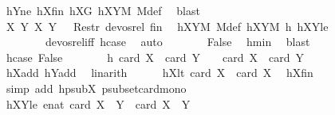 \begin{isabellebody}
\ hY{}ne\ hX{}fin\ hX{}G\ hXYM\ M{\isacharunderscore}{\kern0pt}def\ \isamarkupfalse%
\ blast\isanewline
\ \ \ \ \isamarkupfalse%
\ \isamarkupfalse%
\ {\isachardoublequoteopen}{\isacharparenleft}{\kern0pt}{\isacharparenleft}{\kern0pt}{\isacharquery}{\kern0pt}X{}{\isacharcomma}{\kern0pt}\ {\isacharquery}{\kern0pt}Y{}{\isacharparenright}{\kern0pt}{\isacharcomma}{\kern0pt}\ {\isacharparenleft}{\kern0pt}X{\isacharcomma}{\kern0pt}\ Y{\isacharparenright}{\kern0pt}{\isacharparenright}{\kern0pt}\ {\isasymin}\ \ Restr\ devos{\isacharunderscore}{\kern0pt}rel\ {\isacharquery}{\kern0pt}fin{\isachardoublequoteclose}\ \isamarkupfalse%
\ hXYM\ M{\isacharunderscore}{\kern0pt}def\ hXY{}M\ h\ hXY{}le\ \isanewline
\ \ \ \ \ \ \ \ devos{\isacharunderscore}{\kern0pt}rel{\isacharunderscore}{\kern0pt}iff\ hcase\ \isamarkupfalse%
\ auto\isanewline
\ \ \ \ \isamarkupfalse%
\ \isamarkupfalse%
\ False\ \isamarkupfalse%
\ hmin\ \isamarkupfalse%
\ blast\ \isanewline
\ \ \isamarkupfalse%
\isanewline
\ \ \ \ \isamarkupfalse%
\ hcase{\isacharcolon}{\kern0pt}\ False\isanewline
\ \ \ \ \isamarkupfalse%
\ \isamarkupfalse%
\ h{\isacharcolon}{\kern0pt}\ {\isachardoublequoteopen}card\ {\isacharquery}{\kern0pt}X{}\ {\isacharplus}{\kern0pt}\ card\ {\isacharquery}{\kern0pt}Y{}\ {\isacharminus}{\kern0pt}\ {}\ {\isasymge}\ card\ X\ {\isacharplus}{\kern0pt}\ card\ Y\ {\isacharminus}{\kern0pt}\ {}{\isachardoublequoteclose}\ \isamarkupfalse%
\ hXadd\ hYadd\ \isamarkupfalse%
\ linarith\isanewline
\ \ \ \ \isamarkupfalse%
\ hX{}lt{\isacharcolon}{\kern0pt}\ {\isachardoublequoteopen}card\ {\isacharquery}{\kern0pt}X{}\ {\isacharless}{\kern0pt}\ card\ X{\isachardoublequoteclose}\ \isamarkupfalse%
\ hXfin\ \isamarkupfalse%
\ {\isacharparenleft}{\kern0pt}simp\ add{\isacharcolon}{\kern0pt}\ hpsubX\ psubset{\isacharunderscore}{\kern0pt}card{\isacharunderscore}{\kern0pt}mono{\isacharparenright}{\kern0pt}\isanewline
\ \ \ \ \isamarkupfalse%
\ hXY{}le{\isacharcolon}{\kern0pt}\ {\isachardoublequoteopen}enat\ {\isacharparenleft}{\kern0pt}card\ {\isacharparenleft}{\kern0pt}{\isacharquery}{\kern0pt}X{}\ {\isasymcdots}\ {\isacharquery}{\kern0pt}Y{}{\isacharparenright}{\kern0pt}{\isacharparenright}{\kern0pt}\ {\isasymle}\ card\ {\isacharparenleft}{\kern0pt}X\ {\isasymcdots}\ Y{\isacharparenright}{\kern0pt}{\isachardoublequoteclose}\ \isanewline

\end{isabellebody}
